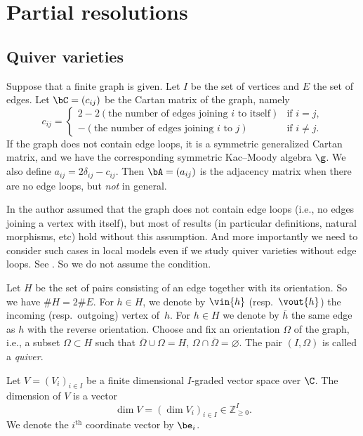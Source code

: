 \section{Partial resolutions}\label{sec:partial}

\subsection{Quiver varieties}\label{subsec:quiver}

Suppose that a f\/inite graph is given. Let $I$ be the set of vertices
and $E$ the set of edges.
%
Let $\bC = (c_{ij})$ be the Cartan matrix of the graph, namely
\begin{equation*}
   c_{ij} =
   \begin{cases}
     2 - 2 (\text{the number of edges joining $i$ to itself})
     & \text{if $i=j$},
\\
     - (\text{the number of edges joining $i$ to $j$})
     & \text{if $i\neq j$}.
   \end{cases}
\end{equation*}
If the graph does not contain edge loops, it is a symmetric
generalized Cartan matrix, and we have the corresponding symmetric
Kac--Moody algebra $\g$. We also def\/ine
\(
   a_{ij} = 2\delta_{ij} - c_{ij}.
\)
Then $\bA = (a_{ij})$ is the adjacency matrix when there are no edge
loops, but {\it not} in general.

In \cite{Na-quiver,Na-alg} the author assumed that the graph does not
contain edge loops (i.e., no edges joining a vertex with itself), but
most of results (in particular def\/initions, natural morphisms, etc)
hold without this assumption. And more importantly we need to consider
such cases in local models even if we study quiver varieties without
edge loops. See . So we do not assume the
condition.

Let $H$ be the set of pairs consisting of an edge together with its
orientation. So we have $\# H = 2\# E$.
%
For $h\in H$, we denote by $\vin{h}$ (resp.\ $\vout{h}$) the incoming
(resp.\ outgoing) vertex of~$h$.  For $h\in H$ we denote by $\overline
h$ the same edge as $h$ with the reverse orientation.
%
Choose and f\/ix an orientation $\Omega$ of the graph,
i.e., a subset $\Omega\subset H$ such that
$\overline\Omega\cup\Omega = H$, $\Omega\cap\overline\Omega = \varnothing$.
%
The pair $(I,\Omega)$ is called a {\it quiver}.


Let $V = (V_i)_{i\in I}$ be a f\/inite dimensional $I$-graded vector
space over $\C$. The dimension of $V$ is a vector
\[
  \dim V = (\dim V_i)_{i\in I}\in \mathbb Z_{\ge 0}^I.
\]
We denote the $i^{\mathrm{th}}$ coordinate vector by $\be_i$.


